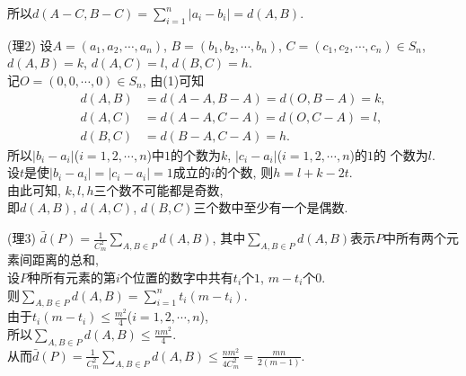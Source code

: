 \documentclass[green]{lsbook}
\begin{document}
所以$d(A-C,B-C)=\sum_{i=1}^{n} |a_i-b_i|=d(A,B)$.

(理2) 设$A=(a_1,a_2,\cdots,a_n)$, $B=(b_1,b_2,\cdots,b_n)$, $C=(c_1,c_2,\cdots,c_n)\in S_n$,\\
$d(A,B)=k$, $d(A,C)=l$, $d(B,C)=h$.\\
记$O=(0,0,\cdots,0)\in S_n$, 由(1)可知
\begin{align*}
d(A,B)&=d(A-A,B-A)=d(O,B-A)=k,\\
d(A,C)&=d(A-A,C-A)=d(O,C-A)=l,\\
d(B,C)&=d(B-A,C-A)=h.
\end{align*}
所以$|b_i-a_i|$($i=1,2,\cdots,n$)中$1$的个数为$k$, $|c_i-a_i|$($i=1,2,\cdots,n$)的$1$的
个数为$l$.\\
设$t$是使$|b_i-a_i|=|c_i-a_i|=1$成立的$i$的个数, 则$h=l+k-2t$.\\
由此可知, $k,l,h$三个数不可能都是奇数,\\ 
即$d(A,B)$, $d(A,C)$, $d(B,C)$三个数中至少有一个是偶数.

(理3) $\bar{d}(P)=\frac{1}{C_{m}^2}\sum_{A,B\in P}{d(A,B)}$, 其中$\sum_{A,B\in P}{d(A,B)}$表示$P$中所有两个元素间距离的总和,\\ 
设$P$种所有元素的第$i$个位置的数字中共有$t_i$个$1$, $m-t_i$个$0$.\\
则$\sum_{A,B\in P}{d(A,B)}=\sum_{i=1}^{n}{t_i}(m-t_i)$.\\
由于$t_i(m-t_i)\leq \frac{m^2}{4}$($i=1,2,\cdots,n$),\\
所以$\sum_{A,B\in P}{d(A,B)} \leq \frac{nm^2}{4}$.\\
从而$\bar{d}(P)=\frac{1}{C_{m}^{2}}\sum_{A,B\in P}{d(A,B)}\leq \frac{nm^2}{4C_{m}^{2}}=\frac{mn}{2(m-1)}.$







\end{document}
